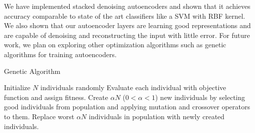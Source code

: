 We have implemented stacked denoising autoencoders and shown that it achieves accuracy comparable to state of the art classifiers like a SVM with RBF kernel. We also shown that our autoencoder layers are learning good representations and are capable of denoising and reconstructing the input with little error. For future work, we plan on exploring other optimization algorithms such as genetic algorithms for training autoencoders. 

\begin{algorithm}[h]
\caption{Genetic Algorithm}
\label{alg:genetic}
\begin{algorithmic}
\STATE Initialize $N$ individuals randomly
	\STATE Evaluate each individual with objective function and assign fitness.
	\STATE Create $\alpha N$ ($0 < \alpha < 1$) new individuals by selecting good individuals from population and applying mutation and crossover operators to them.
	\STATE Replace worst $\alpha N$ individuals in population with newly created individuals.
\ENDFOR
\end{algorithmic}
\end{algorithm}
